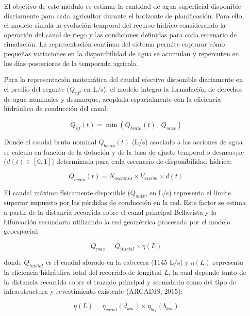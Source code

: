 \documentclass[12pt]{report}
\begin{document}
El objetivo de este módulo es estimar la cantidad de agua superficial disponible diariamente para cada agricultor durante el horizonte de planificación. Para ello, el modelo simula la evolución temporal del recurso hídrico considerando la operación del canal de riego y las condiciones definidas para cada escenario de simulación. La representación continua del sistema permite capturar cómo pequeñas variaciones en la disponibilidad de agua se acumulan y repercuten en los días posteriores de la temporada agrícola.

Para la representación matemática del caudal efectivo disponible diariamente en el predio del regante ($Q_{ef}$, en L/s), el modelo integra la formulación de derechos de agua nominales y desmarque, acoplada espacialmente con la eficiencia hidráulica de conducción del canal:

\begin{equation}
Q_{ef}(t) = \min\left( Q_{bruto}(t),\; Q_{max} \right)
\end{equation}

Donde el caudal bruto nominal $Q_{bruto}(t)$ (L/s) asociado a las acciones de agua se calcula en función de la dotación y de la tasa de ajuste temporal o desmarque ($d(t) \in [0,1]$) determinada para cada escenario de disponibilidad hídrica:

\begin{equation}
Q_{bruto}(t) = N_{acciones} \times V_{accion} \times d(t)
\end{equation}

El caudal máximo físicamente disponible ($Q_{max}$, en L/s) representa el límite superior impuesto por las pérdidas de conducción en la red. Este factor se estima a partir de la distancia recorrida sobre el canal principal Bellavista y la bifurcación secundaria utilizando la red geométrica procesada por el modelo geoespacial:

\begin{equation}
Q_{max} = Q_{inicial} \times \eta(L)
\end{equation}

donde $Q_{inicial}$ es el caudal aforado en la cabecera (1145 L/s) y $\eta(L)$ representa la eficiencia hidráulica total del recorrido de longitud $L$, la cual depende tanto de la distancia recorrida sobre el trazado principal y secundario como del tipo de infraestructura y revestimiento existente (ARCADIS, 2015):

\begin{equation}
\eta(L) = \eta_{canal}(d_{km}) \times \eta_{bif}(b_{km})
\end{equation}
\end{document}

